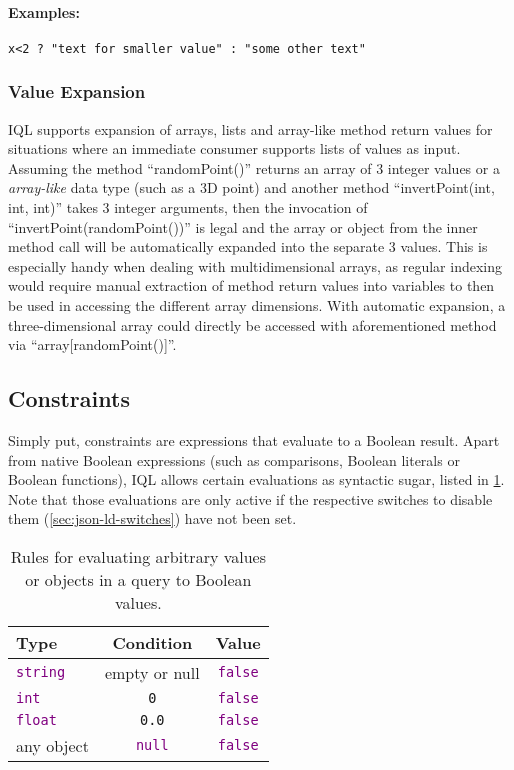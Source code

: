 \documentclass[11pt,a4paper,portrait]{article}
\newcommand{\iql}{IQL\xspace}
\newcommand{\keyword}[1]{\textcolor{purple}{\texttt{#1}}}
\begin{document}
\paragraph{Examples:}

\begin{verbatim}
x<2 ? "text for smaller value" : "some other text"
\end{verbatim}

\subsubsection{Value Expansion}
\label{sec:value-expansion}

\iql supports expansion of arrays, lists and array-like method return values for situations where an immediate consumer supports lists of values as input. Assuming the method ``randomPoint()'' returns an array of 3 integer values or a \textit{array-like} data type (such as a 3D point) and another method ``invertPoint(int, int, int)'' takes 3 integer arguments, then the invocation of ``invertPoint(randomPoint())'' is legal and the array or object from the inner method call will be automatically expanded into the separate 3 values. This is especially handy when dealing with multidimensional arrays, as regular indexing would require manual extraction of method return values into variables to then be used in accessing the different array dimensions. With automatic expansion, a three-dimensional array could directly be accessed with aforementioned method via ``array[randomPoint()]''.

\subsection{Constraints}
\label{sec:constraints}

Simply put, constraints are expressions that evaluate to a Boolean result. 
Apart from native Boolean expressions (such as comparisons, Boolean literals or Boolean functions), \iql allows certain evaluations as syntactic sugar, listed in \cref{tab:constraints-translation}.
Note that those evaluations are only active if the respective switches to disable them (\ref{sec:json-ld-switches}) have not been set.


\begin{table}
\centering\begin{tabular}{|l|c|c|}
	\hline 
	Type & Condition & Value \\ 
	\hline 
	\keyword{string} & empty or null & \keyword{false}  \\ 
	\hline 
	\keyword{int} & \texttt{0} & \keyword{false} \\ 
	\hline 
	\keyword{float} & \texttt{0.0} & \keyword{false} \\ 
	\hline
	any object & \keyword{null} & \keyword{false} \\ 
	\hline 
\end{tabular}
\caption{Rules for evaluating arbitrary values or objects in a query to Boolean values.}
\label{tab:constraints-translation}
\end{table}
\end{document}
